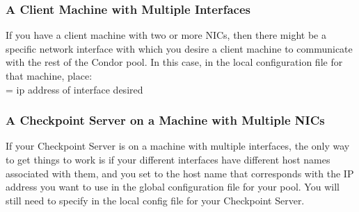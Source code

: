 \subsubsection{A Client Machine with Multiple Interfaces}

If you have a client machine with two or more NICs, then there might be
a specific network interface with which you desire a client machine to
communicate with the rest of the Condor pool. In this case, in the local
configuration file for that machine, place: \\ 
 = ip address of interface desired \\


\subsubsection{A Checkpoint Server on a Machine with Multiple NICs}

If your Checkpoint Server is on a machine with multiple interfaces,
the only way to get things to work is if your different interfaces
have different host names associated with them, and you set
 to the host name that corresponds with the
IP address you want to use in the global configuration file for your pool.
You will still need to specify  in the local
config file for your Checkpoint Server.

